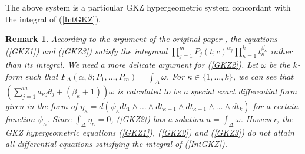 \documentclass[10pt]{article}
\newtheorem{rem}{Remark}[section]
\begin{document}
The above system is a particular GKZ hypergeometric system concordant with  the integral of (\ref{IntGKZ}).


\begin{rem} \label{RemRankGKZ}
According to the argument of  the original paper \cite{GKZ},
the equations (\ref{GKZ1}) and (\ref{GKZ3}) satisfy the integrand $\prod_{j=1}^m P_j(t; c)^{\alpha_j} \prod_{\kappa=1}^k t_\kappa^{\beta_\kappa}$  rather than its integral.  
We need a more delicate argument for (\ref{GKZ2}).
Let $\omega$ be the $k$-form such that $F_\Delta (\alpha,\beta; P_1,\ldots,P_m) =\int_\Delta \omega$.
For $\kappa \in \{1,\ldots,k\}$,
we can see that $(\sum_{j=1}^m a_{\kappa j} \theta_j +(\beta_\kappa +1))\omega$ is calculated to be
a special exact differential form given in the form of
$\eta_\kappa =d (\psi_\kappa dt_1 \wedge \ldots \wedge dt_{\kappa-1} \wedge dt_{\kappa+1} \wedge \ldots \wedge dt_k)$
for a certain function $\psi_\kappa$.
Since $\int_\Delta \eta_\kappa =0$, (\ref{GKZ2}) has a solution $u =\int_\Delta \omega$.
However, the GKZ hypergeometric equations  (\ref{GKZ1}), (\ref{GKZ2}) and (\ref{GKZ3})  do not attain all differential equations satisfying the integral of (\ref{IntGKZ}).
\end{rem}
\end{document}
